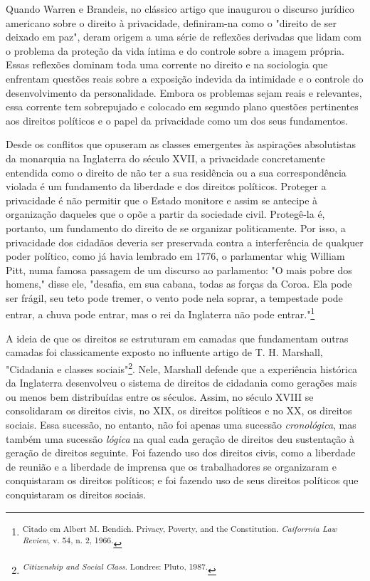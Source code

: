 Quando Warren e Brandeis, no clássico artigo que inaugurou o discurso
jurídico americano sobre o direito à privacidade, definiram-na como o
"direito de ser deixado em paz", deram origem a uma série de reflexões
derivadas que lidam com o problema da proteção da vida íntima e do
controle sobre a imagem própria. Essas reflexões dominam toda uma
corrente no direito e na sociologia que enfrentam questões reais sobre a
exposição indevida da intimidade e o controle do desenvolvimento da
personalidade. Embora os problemas sejam reais e relevantes, essa
corrente tem sobrepujado e colocado em segundo plano questões
pertinentes aos direitos políticos e o papel da privacidade como um dos
seus fundamentos.

Desde os conflitos que opuseram as classes emergentes às aspirações
absolutistas da monarquia na Inglaterra do século XVII, a privacidade
concretamente entendida como o direito de não ter a sua residência ou a
sua correspondência violada é um fundamento da liberdade e dos direitos
políticos. Proteger a privacidade é não permitir que o Estado monitore e
assim se antecipe à organização daqueles que o opõe a partir da
sociedade civil. Protegê-la é, portanto, um fundamento do direito de se
organizar politicamente. Por isso, a privacidade dos cidadãos deveria
ser preservada contra a interferência de qualquer poder político, como
já havia lembrado em 1776, o parlamentar whig William Pitt, numa famosa
passagem de um discurso ao parlamento: "O mais pobre dos homens," disse
ele, "desafia, em sua cabana, todas as forças da Coroa. Ela pode ser
frágil, seu teto pode tremer, o vento pode nela soprar, a tempestade
pode entrar, a chuva pode entrar, mas o rei da Inglaterra não pode
entrar."\footnote{\textsuperscript{Citado em Albert M. Bendich. Privacy,
  Poverty, and the Constitution. \emph{Caiforrnia Law Review}, v. 54, n.
  2, 1966. }}

A ideia de que os direitos se estruturam em camadas que fundamentam
outras camadas foi classicamente exposto no influente artigo de T. H.
Marshall, "Cidadania e classes sociais"\footnote{\textsuperscript{\emph{Citizenship
  and Social Class}. Londres: Pluto, 1987.}}. Nele, Marshall defende que
a experiência histórica da Inglaterra desenvolveu o sistema de direitos
de cidadania como gerações mais ou menos bem distribuídas entre os
séculos. Assim, no século XVIII se consolidaram os direitos civis, no
XIX, os direitos políticos e no XX, os direitos sociais. Essa sucessão,
no entanto, não foi apenas uma sucessão \emph{cronológica}, mas também
uma sucessão \emph{lógica} na qual cada geração de direitos deu
sustentação à geração de direitos seguinte. Foi fazendo uso dos direitos
civis, como a liberdade de reunião e a liberdade de imprensa que os
trabalhadores se organizaram e conquistaram os direitos políticos; e foi
fazendo uso de seus direitos políticos que conquistaram os direitos
sociais.

